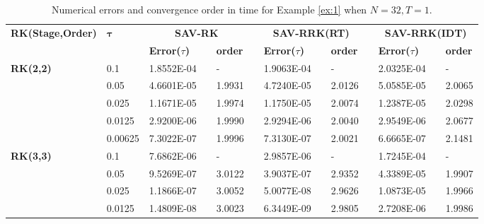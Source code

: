 	
\begin{table}[H]\footnotesize
	\centering
	\caption{Numerical errors and convergence order in time for Example \ref{ex:1} when $N=32, T = 1$.}
	\begin{tabular}{lllllrlrlrlrlrl}
	\toprule
	\multicolumn{2}{l}{\multirow{2}[3]{*}{\textbf{RK(Stage,Order)}}} & \multicolumn{2}{l}{\multirow{2}[3]{*}{$\bm{\tau}$}} & \multicolumn{3}{c}{\textbf{SAV-RK}} &       & \multicolumn{3}{c}{\textbf{SAV-RRK(RT)}} &       & \multicolumn{3}{c}{\textbf{SAV-RRK(IDT)}} \\
	\cmidrule{5-7}\cmidrule{9-11}\cmidrule{13-15}    \multicolumn{2}{l}{} & \multicolumn{2}{l}{} & \textbf{Error($\tau$)} &       & \textbf{order} &       & \textbf{Error($\tau$)} &       & \textbf{order} &       & \textbf{Error($\tau$)} &       & \textbf{order} \\
	\hline
	\multicolumn{2}{l}{\multirow{5}[0]{*}{\textbf{RK(2,2)}}} & \multicolumn{2}{l}{0.1} & 1.8552E-04 &       & -     &       & 1.9063E-04 &       & -     &       & 2.0325E-04 &       & - \\
	\multicolumn{2}{l}{} & \multicolumn{2}{l}{0.05} & 4.6601E-05 &       & 1.9931  &       & 4.7240E-05 &       & 2.0126  &       & 5.0585E-05 &       & 2.0065  \\
	\multicolumn{2}{l}{} & \multicolumn{2}{l}{0.025} & 1.1671E-05 &       & 1.9974  &       & 1.1750E-05 &       & 2.0074  &       & 1.2387E-05 &       & 2.0298  \\
	\multicolumn{2}{l}{} & \multicolumn{2}{l}{0.0125} & 2.9200E-06 &       & 1.9990  &       & 2.9294E-06 &       & 2.0040  &       & 2.9549E-06 &       & 2.0677  \\
	\multicolumn{2}{l}{} & \multicolumn{2}{l}{0.00625} & 7.3022E-07 &       & 1.9996  &       & 7.3130E-07 &       & 2.0021  &       & 6.6665E-07 &       & 2.1481  \\
	\multicolumn{2}{l}{\multirow{5}[0]{*}{\textbf{RK(3,3)}}} & \multicolumn{2}{l}{0.1} & 7.6862E-06 &       & -     &       & 2.9857E-06 &       & -     &       & 1.7245E-04 &       & - \\
	\multicolumn{2}{l}{} & \multicolumn{2}{l}{0.05} & 9.5269E-07 &       & 3.0122  &       & 3.9037E-07 &       & 2.9352  &       & 4.3389E-05 &       & 1.9907  \\
	\multicolumn{2}{l}{} & \multicolumn{2}{l}{0.025} & 1.1866E-07 &       & 3.0052  &       & 5.0077E-08 &       & 2.9626  &       & 1.0873E-05 &       & 1.9966  \\
	\multicolumn{2}{l}{} & \multicolumn{2}{l}{0.0125} & 1.4809E-08 &       & 3.0023  &       & 6.3449E-09 &       & 2.9805  &       & 2.7208E-06 &       & 1.9986  \\

\end{tabular}
\end{table}
